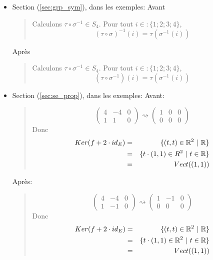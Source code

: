 \begin{itemize}
\begin{itemize}
      \item Section (\ref{sec:grp_sym}), dans les exemples: Avant
        \begin{quote}
          Calculons $\tau \circ \sigma^{-1} \in S_4$. Pour tout $i \in :\{1; 2; 3; 4\}$,
          $$(\tau \circ \sigma)^{-1}(i) = \tau(\sigma^{-1}(i))$$
        \end{quote}
        Après
        \begin{quote}
          Calculons $\tau \circ \sigma^{-1} \in S_4$. Pour tout $i \in :\{1; 2; 3; 4\}$,
          $$(\tau \circ \sigma^{-1})(i) = \tau(\sigma^{-1}(i))$$
        \end{quote}
        
      \item Section (\ref{sec:se_prop}), dans les exemples: Avant:
        \begin{quote}
          $$\left( \begin{array}{cc|c} 4 & -4 & 0 \\ 1 & 1 & 0 \end{array} \right) 
            \rightsquigarrow 
            \left( \begin{array}{cc|c} 1 & 0 & 0 \\ 0 & 0 & 0 \end{array} \right) $$
          Donc 
          \begin{eqnarray*}
            Ker(f + 2 \cdot id_E) &=& \{(t, t) \in \mathbb{R}^2 ~ \vert ~ \mathbb{R} \} \\
              &=& \{t \cdot (1, 1) \in R^2 ~ \vert ~ t \in \mathbb{R} \} \\
              &=& Vect((1, 1))
          \end{eqnarray*}
        \end{quote}
        Après:
        \begin{quote}
          $$\left( \begin{array}{cc|c} 4 & -4 & 0 \\ 1 & -1 & 0 \end{array} \right) 
            \rightsquigarrow 
            \left( \begin{array}{cc|c} 1 & -1 & 0 \\ 0 & 0 & 0 \end{array} \right) $$
          Donc 
          \begin{eqnarray*}
            Ker(f + 2 \cdot id_E) &=& \{(t, t) \in \mathbb{R}^2 ~ \vert ~ \mathbb{R} \} \\
              &=& \{t \cdot (1, 1) \in \mathbb{R}^2 ~ \vert ~ t \in \mathbb{R} \} \\
              &=& Vect((1, 1))
          \end{eqnarray*}
        \end{quote}
        

\end{itemize}
\end{itemize}
